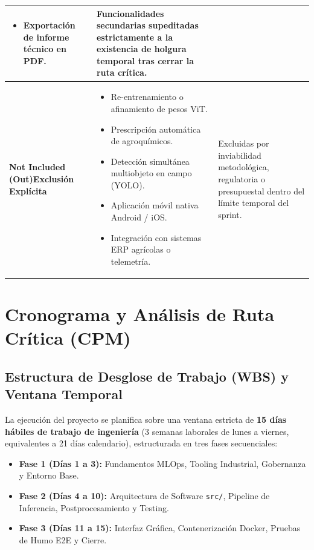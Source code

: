 \documentclass[12pt,letterpaper]{article}
\begin{document}
\begin{table}[!htbp]
\begin{tabularx}{\textwidth}{>{\raggedright\arraybackslash}p{2.25cm} >{\raggedright\arraybackslash}X >{\raggedright\arraybackslash}p{4.25cm}}
\begin{itemize}[leftmargin=*,noitemsep,topsep=0pt,before=\vspace{-0.6\baselineskip},after=\vspace{-0.8\baselineskip}]
    \item Exportación de informe técnico en PDF.
\end{itemize} & 
Funcionalidades secundarias supeditadas estrictamente a la existencia de holgura temporal tras cerrar la ruta crítica. \\
\midrule
\textbf{Not Included (Out)\newline Exclusión Explícita} & 
\begin{itemize}[leftmargin=*,noitemsep,topsep=0pt,before=\vspace{-0.6\baselineskip},after=\vspace{-0.8\baselineskip}]
    \item Re-entrenamiento o afinamiento de pesos ViT.
    \item Prescripción automática de agroquímicos.
    \item Detección simultánea multiobjeto en campo (YOLO).
    \item Aplicación móvil nativa Android / iOS.
    \item Integración con sistemas ERP agrícolas o telemetría.
\end{itemize} & 
Excluidas por inviabilidad metodológica, regulatoria o presupuestal dentro del límite temporal del sprint. \\
\bottomrule
\end{tabularx}
\end{table}

\FloatBarrier
\section{Cronograma y Análisis de Ruta Crítica (CPM)}

\subsection{Estructura de Desglose de Trabajo (WBS) y Ventana Temporal}
La ejecución del proyecto se planifica sobre una ventana estricta de \textbf{15 días hábiles de trabajo de ingeniería} (3 semanas laborales de lunes a viernes, equivalentes a 21 días calendario), estructurada en tres fases secuenciales:
\begin{itemize}[leftmargin=*,noitemsep]
    \item \textbf{Fase 1 (Días 1 a 3):} Fundamentos MLOps, Tooling Industrial, Gobernanza y Entorno Base.
    \item \textbf{Fase 2 (Días 4 a 10):} Arquitectura de Software \texttt{src/}, Pipeline de Inferencia, Postprocesamiento y Testing.
    \item \textbf{Fase 3 (Días 11 a 15):} Interfaz Gráfica, Contenerización Docker, Pruebas de Humo E2E y Cierre.
\end{itemize}
\end{document}
